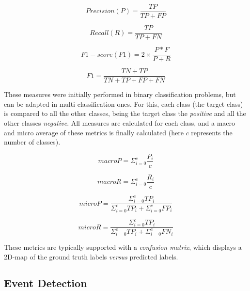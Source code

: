 \begin{equation}
\label{eq:precision}
Precision (P) = \frac{TP}{TP+FP}
\end{equation}

\begin{equation}
\label{eq:recall}
Recall (R) = \frac{TP}{TP+FN}
\end{equation}

\begin{equation}
\label{eq:f1_score}
F1-score (F1) = 2 \times \frac{P*F}{P+R}
\end{equation}

\begin{equation}
\label{eq:accuracy}
F1 = \frac{TN+TP}{TN+TP+FP+FN}
\end{equation}

These measures were initially performed in binary classification problems, but can be adapted in multi-classification ones. For this, each class (the target class) is compared to all the other classes, being the target class the \textit{positive} and all the other classes \textit{negative}. All measures are calculated for each class, and a macro and micro average of these metrics is finally calculated (here $c$ represents the number of classes).

\begin{equation}
macroP = \Sigma_{i=0}^c \frac{P_i}{c}
\end{equation}

\begin{equation}
macroR = \Sigma_{i=0}^c \frac{R_i}{c}
\end{equation}

\begin{equation}
microP = \frac{\Sigma_{i=0}^c TP_i}{\Sigma_{i=0}^c TP_i + \Sigma_{i=0}^c FP_i}
\end{equation}

\begin{equation}
microR = \frac{\Sigma_{i=0}^c TP_i}{\Sigma_{i=0}^c TP_i + \Sigma_{i=0}^c FN_i}
\end{equation}

These metrics are typically supported with a \textit{confusion matrix}, which displays a 2D-map of the ground truth labels \textit{versus} predicted labels.

\subsection{Event Detection}
\label{subsec:event_metrics}

